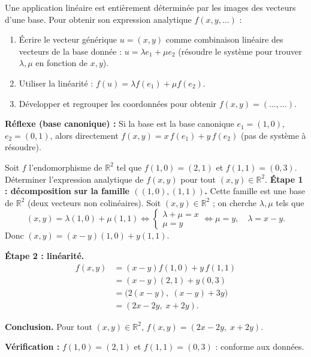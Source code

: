 \documentclass[11pt]{article}
\newcommand{\cle}[1]{{\popxbold\color{popdark}#1}}
\begin{document}
\begin{methode}
Une application linéaire est entièrement déterminée par les images des vecteurs d'une base. Pour obtenir son \cle{expression analytique} $f(x,y,\ldots)$ :
\begin{enumerate}
\item Écrire le vecteur générique $u=(x,y)$ comme combinaison linéaire des vecteurs de la base donnée : $u=\lambda e_1+\mu e_2$ (résoudre le système pour trouver $\lambda,\mu$ en fonction de $x,y$).
\item Utiliser la linéarité : $f(u)=\lambda f(e_1)+\mu f(e_2)$.
\item Développer et regrouper les coordonnées pour obtenir $f(x,y)=(\ldots,\ldots)$.
\end{enumerate}
\textbf{Réflexe (base canonique) :} Si la base est la base canonique $e_1=(1,0)$, $e_2=(0,1)$, alors directement $f(x,y)=x\,f(e_1)+y\,f(e_2)$ (pas de système à résoudre).
\end{methode}

\begin{exoresolu}
Soit $f$ l'endomorphisme de $\mathbb{R}^2$ tel que $f(1,0)=(2,1)$ et $f(1,1)=(0,3)$. Déterminer l'expression analytique de $f(x,y)$ pour tout $(x,y)\in\mathbb{R}^2$.
\tcblower
\textbf{Étape 1 : décomposition sur la famille $((1,0),(1,1))$.} Cette famille est une base de $\mathbb{R}^2$ (deux vecteurs non colinéaires). Soit $(x,y)\in\mathbb{R}^2$ ; on cherche $\lambda,\mu$ tels que
\[ (x,y)=\lambda(1,0)+\mu(1,1)\iff\begin{cases}\lambda+\mu=x\\\mu=y\end{cases}\iff \mu=y,\quad \lambda=x-y. \]
Donc $(x,y)=(x-y)(1,0)+y(1,1)$.

\textbf{Étape 2 : linéarité.}
\begin{align*}
f(x,y)&=(x-y)f(1,0)+y\,f(1,1)\\
&=(x-y)(2,1)+y(0,3)\\
&=\big(2(x-y),\;(x-y)+3y\big)\\
&=(2x-2y,\;x+2y).
\end{align*}

\textbf{Conclusion.} Pour tout $(x,y)\in\mathbb{R}^2$, $f(x,y)=(2x-2y,\;x+2y)$.

\textbf{Vérification :} $f(1,0)=(2,1)$ et $f(1,1)=(0,3)$ : conforme aux données.
\end{exoresolu}
\end{document}
